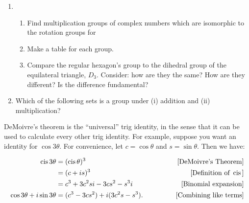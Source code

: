\documentclass[../textbook.tex]{subfiles}
\begin{document}
\begin{enumerate}
\item \begin{enumerate}
\item Find multiplication groups of complex numbers which are isomorphic to the rotation groups for
\begin{enumerate}
\end{enumerate}
\item Make a table for each group.
\item Compare the regular hexagon's group to the dihedral group of the equilateral triangle, $D_3$. Consider: how are they the same? How are they different? Is the difference fundamental?
\end{enumerate}
\item Which of the following sets is a group under (i) addition and (ii) multiplication?
\begin{enumerate}
\end{enumerate}

\setcounter{cg_problem_i}{\value{enumi}}
\end{enumerate}

\noindent DeMoivre's theorem is the ``universal'' trig identity, in the sense that it can be used to calculate every other trig identity. For example, suppose you want an identity for $\cos 3\theta$. For convenience, let $c=\cos\theta$ and $s=\sin\theta$. Then we have:

\begin{align*}
\operatorname{cis} 3\theta &= (\operatorname{cis} \theta)^3  & \qquad \text{[DeMoivre's Theorem]} \\
&= (c+is)^3 & \qquad \text{[Definition of } \operatorname{cis} \text{]} \\
&= c^3 + 3c^2s i - 3cs^2 - s^3 i & \qquad \text{[Binomial expansion]} \\
\cos 3\theta + i\sin 3\theta &= (c^3 - 3cs^2) + i (3c^2 s - s^3). \qquad & \text{[Combining like terms]}
\end{align*}
\end{document}
